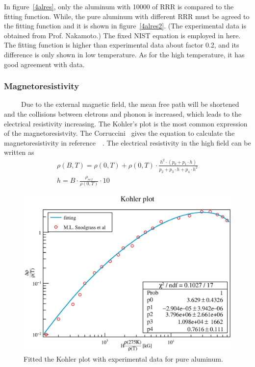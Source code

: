 In figure~\ref{4alres}, only the aluminum with 10000 of RRR is compared to the fitting function.
While, the pure aluminum with different RRR must be agreed to the fitting function and it is shown in figure~\ref{4alres2}.
(The experimental data is obtained from Prof. Nakamoto.)
The fixed NIST equation is employed in here.
The fitting function is higher than experimental data about factor 0.2, and its difference is only shown in low temperature.
As for the high temperature, it has good agreement with data.

  \subsubsection{Magnetoresistivity}
~~~~~Due to the external magnetic field, the mean free path will be shortened and the collisions between eletrons and phonon is increased, which leads to the electrical resistivity increasing.
The Kohler's plot is the most common expression of the magnetoresistvity.
The Corruccini~\cite{corr} gives the equation to calculate the magnetoresistivity in reference~\cite{fick}~\cite{arp}.
The electrical resistivity in the high field can be written as
\begin{gather}
 \rho(B, T) = \rho(0, T) + \rho(0, T) \cdot \frac{h^2 \cdot (p_0 + p_1 \cdot h)}{p_2 + p_3\cdot h + p_4 \cdot h^2} \\
 h = B \cdot \frac{\rho_{ref}}{\rho(0, T)} \cdot 10
\end{gather}
\begin{figure}[H]
 \centering
 \includegraphics[scale=0.45]{chapter5/fig/Magnetores.eps}
 \caption{Fitted the Kohler plot with experimental data for pure aluminum.}
 \label{4magres}
\end{figure}

